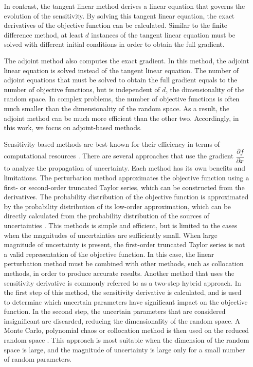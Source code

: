 In contrast, the tangent linear method
derives a linear equation that governs the evolution of the sensitivity.
By solving this tangent linear equation, the exact derivatives of the objective
function can be calculated.  Similar to the finite difference method, at
least $d$ instances of the tangent linear equation must be solved with
different initial conditions in order to obtain the full gradient.

The adjoint method also computes the exact gradient.  In this method, the
adjoint linear equation is solved instead of the tangent linear equation.
The number of adjoint equations that must be solved to obtain the full gradient
equals to the number of objective functions, but is independent of $d$, the
dimensionality of the random space.  In complex problems, the number of
objective functions is often much smaller than the dimensionality of the
random space.  As a result, the adjoint method can be much more efficient
than the other two.  Accordingly, in this work, we focus on adjoint-based
methods.

Sensitivity-based methods are best known for their efficiency in terms of
computational resources \cite[]{dakota}.
There are several approaches that use the gradient
$\dfrac{\partial f}{\partial x}$ to analyze the propagation of uncertainty.
Each method has its own benefits and limitations.
The perturbation method approximates the objective function using
a first- or second-order truncated Taylor series, which can be constructed from
the derivatives.
The probability distribution of the objective function is approximated by
the probability distribution of its low-order approximation, which can be
directly calculated from the probability distribution of the sources of
uncertainties \cite[]{sensitivity1}.  This methods is simple and efficient,
but is limited to the cases when the magnitudes of uncertainties are
sufficiently small.
When large magnitude of uncertainty is present, the first-order truncated
Taylor series is not a valid representation of the objective function.
In this case, the linear perturbation method must be combined with other
methods, such as collocation methods, in order to produce accurate results.
Another method that uses the sensitivity
derivative is commonly referred to as a two-step hybrid approach.
In the first step of this method, the sensitivity derivative is calculated,
and is used to determine which uncertain parameters have significant impact
on the objective function.  In the second step, the uncertain parameters
that are considered insignificant are discarded, reducing the dimensionality
of the random space.  A Monte Carlo, polynomial chaos or collocation method
is then used on the reduced random space \cite[]{mars_entry}.
This approach is most suitable
when the dimension of the random space is large, and the magnitude of
uncertainty is large only for a small number of random parameters.

